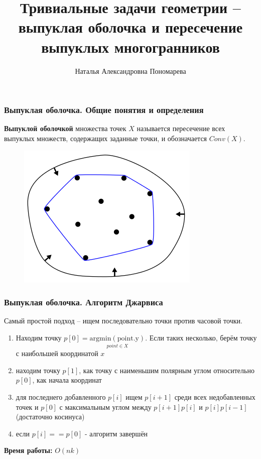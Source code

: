 \documentclass[notheorems,aspectratio=169]{beamer}
\title{Тривиальные задачи геометрии -- выпуклая оболочка и пересечение выпуклых многогранников}
\author{Наталья Александровна Пономарева}
\institute[344 группа]{344 группа \\ Лаборатория распознавания изображений \\  СПбГУ}
\begin{document}
 
\begin{frame}
  \maketitle
  	\centering
\end{frame}


\begin{frame}\frametitle{Выпуклая оболочка. Общие понятия и определения}
	\textbf{Выпуклой оболочкой} множества точек $X$ называется пересечение всех выпуклых множеств, 
	содержащих заданные точки, и обозначается $Conv(X)$.
	\begin{figure}
		\includegraphics[height=0.5\textheight, keepaspectratio]{ConvexHull.png}
	\end{figure}
\end{frame}

\begin{frame}\frametitle{Выпуклая оболочка. Алгоритм Джарвиса}
	Самый простой подход -- ищем последовательно точки против часовой точки. 
	\begin{enumerate}
		\item Находим точку $p[0] = \underset{point \in X}{\operatorname{argmin(point.y)}} $. Если таких несколько, берём точку с наибольшей координатой $x$
		\item находим точку $p[1]$, как точку с наименьшим полярным углом относительно $p[0]$, как начала координат
		\item для последнего добавленного $p[i]$ ищем $p[i+1]$ среди всех недобавленных точек и $p[0]$ с максимальным углом между $p[i+1]p[i]$ и $p[i]p[i-1]$ (достаточно косинуса)
		\item если $p[i] == p[0]$ - алгоритм завершён
	\end{enumerate}
	\textbf{Время работы:} $O\left(nk \right)$
\end{frame}
\end{document}
